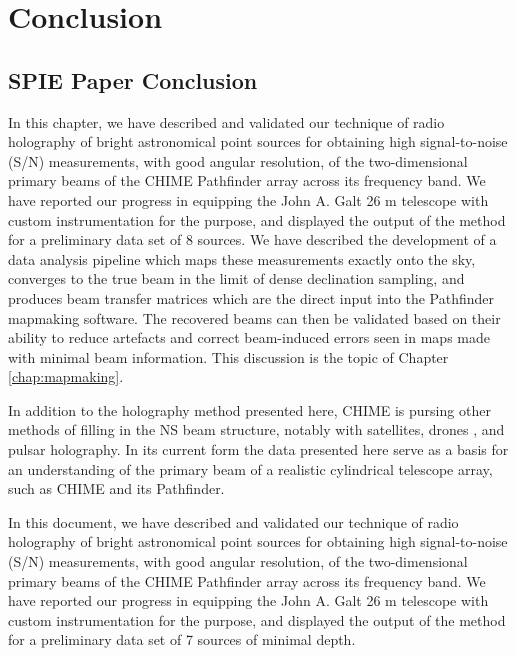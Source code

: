 \chapter{Conclusion}

\section{SPIE Paper Conclusion} \label{ch:conclusion:sec:hol}

In this chapter, we have described and validated our technique of radio holography of bright astronomical point sources for obtaining high signal-to-noise (S/N) measurements, with good angular resolution, of the two-dimensional primary beams of the CHIME Pathfinder array across its frequency band. We have reported our progress in equipping the John A. Galt 26 m telescope with custom instrumentation for the purpose, and displayed the output of the method for a preliminary data set of 8 sources. We have described the development of a data analysis pipeline which maps these measurements exactly onto the sky, converges to the true beam in the limit of dense declination sampling, and produces beam transfer matrices which are the direct input into the Pathfinder mapmaking software. The recovered beams can then be validated based on their ability to reduce artefacts and correct beam-induced errors seen in maps made with minimal beam information. This discussion is the topic of Chapter \ref{chap:mapmaking}.

In addition to the holography method presented here, CHIME is pursing other methods of filling in the NS beam structure, notably with satellites\citep{hol2, sat2}, drones \citep{drone}, and pulsar holography. In its current form the data presented here serve as a basis for an understanding of the primary beam of a realistic cylindrical telescope array, such as CHIME and its Pathfinder.

In this document, we have described and validated our technique of radio holography of bright astronomical point sources for obtaining high signal-to-noise (S/N) measurements, with good angular resolution, of the two-dimensional primary beams of the CHIME Pathfinder array across its frequency band. We have reported our progress in equipping the John A. Galt 26 m telescope with custom instrumentation for the purpose, and displayed the output of the method for a preliminary data set of 7 sources of minimal depth. 

